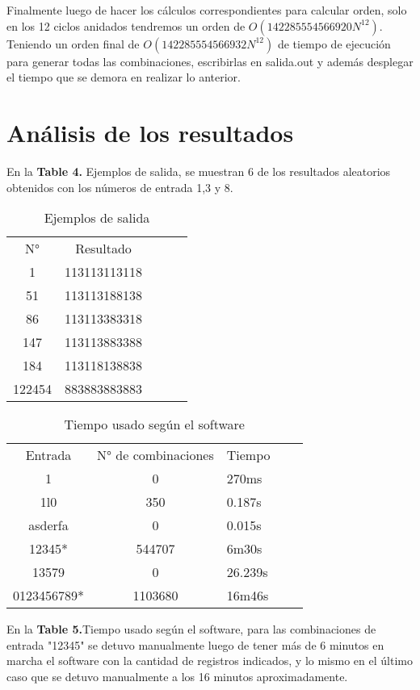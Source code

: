 \documentclass[9pt,twocolumn,twoside]{optica}
\begin{document}
Finalmente luego de hacer los cálculos correspondientes para calcular orden, solo en los 12 ciclos anidados tendremos un orden de $O(142285554566920N^{12})$.
Teniendo un orden final de $ O(142285554566932N^{12}) $ de tiempo de ejecución para generar todas las combinaciones, escribirlas en salida.out y además desplegar el tiempo que se demora en realizar lo anterior.


\section{Análisis de los resultados}

En la \textbf{Table 4.} Ejemplos de salida, se muestran 6 de los resultados aleatorios obtenidos con los números de entrada 1,3 y 8. 

\begin{table}
\centering
\caption{Ejemplos de salida }
\label{my-label}
\begin{tabular}{|c|c|lll}
\cline{1-2}
N° & Resultado &  &  &  \\ \cline{1-2}
1         & 113113113118         &  &  &  \\ \cline{1-2}
51         & 113113188138         &  &  &  \\ \cline{1-2}
86         & 113113383318         &  &  &  \\ \cline{1-2}
147         & 113113883388         &  &  &  \\ \cline{1-2}
184         & 113118138838         &  &  &  \\ \cline{1-2}
122454         & 883883883883         &  &  &  \\ \cline{1-2}
\end{tabular}
\end{table}

\begin{table}
\centering
\caption{Tiempo usado según el software}
\label{my-label}
\begin{tabular}{|c|c|lll}
\cline{1-2}
Entrada & N° de combinaciones & Tiempo &  &  \\ \cline{1-3}
1         & 0         & 270ms &  &  \\ \cline{1-3}
1l0         & 350         & 0.187s &  &  \\ \cline{1-3}
asderfa         & 0         & 0.015s &  &  \\ \cline{1-3}
12345*         & 544707         & 6m30s &  &  \\ \cline{1-3}
13579         & 0         & 26.239s  &  &  \\ \cline{1-3}
0123456789*         & 1103680         & 16m46s  &  &  \\ \cline{1-3}
\end{tabular}
\end{table}
En la \textbf{Table 5.}Tiempo usado según el software, para las combinaciones de entrada "12345" se detuvo manualmente luego de tener más de 6 minutos en marcha el software con la cantidad de registros indicados, y lo mismo en el último caso que se detuvo manualmente a los 16 minutos aproximadamente.
\end{document}
